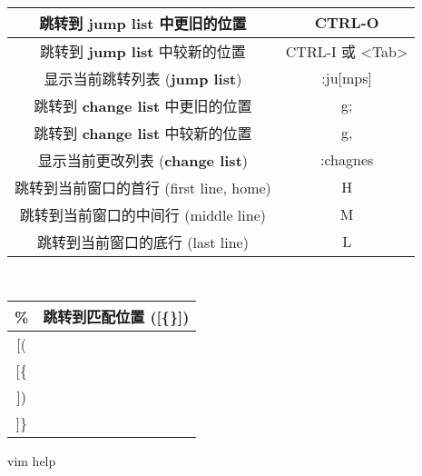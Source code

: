 \documentclass{article}
\begin{document}
\begin{table}[h!]
  \tt\center
  \begin{tabular}{|c|c|}
    \hline
    跳转到 {\bf jump list} 中更旧的位置  &  CTRL-O             \\\hline
    跳转到 {\bf jump list} 中较新的位置  &  CTRL-I 或 <Tab>    \\\hline
    显示当前跳转列表 ({\bf jump list})        &  :ju[mps]           \\\hline
    跳转到 {\bf change list} 中更旧的位置     &  g;             \\\hline
    跳转到 {\bf change list} 中较新的位置     &  g,    \\\hline
    显示当前更改列表 ({\bf change list})      &  :chagnes           \\\hline
    跳转到当前窗口的首行  (first line, home)  &  H     \\\hline
    跳转到当前窗口的中间行 (middle line)      &  M       \\\hline
    跳转到当前窗口的底行 (last line)          &  L     \\\hline
  \end{tabular}
\end{table}

\begin{table}[h!]
  \tt\center
  \begin{tabular}{|c|c|}
    \hline
    \%                & 跳转到匹配位置  ([\{\}]) \\\hline
    {[(}              &    \\\hline
    {[\{}             &    \\\hline
    {])}              &    \\\hline
    {]\}}             & \\\hline
  \end{tabular}
\end{table}
vim help

\end{document}

